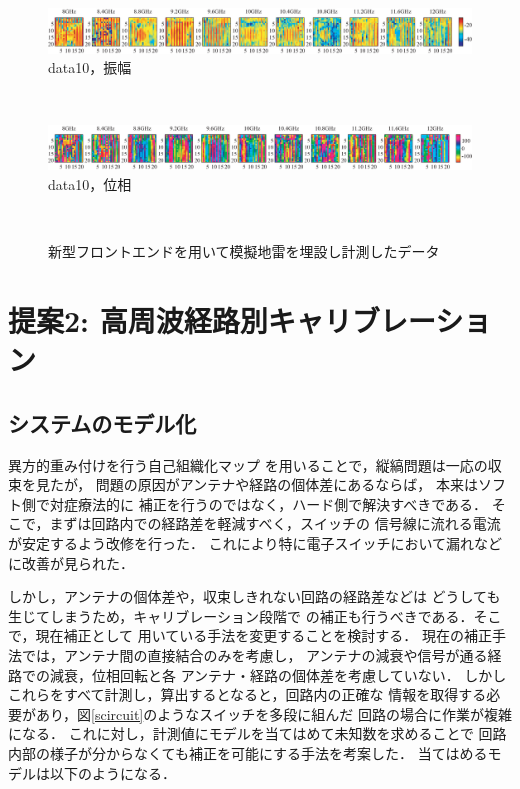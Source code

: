 ﻿\documentclass[12pt,oneside]{jsbook}
\begin{document}
\begin{figure}[hbtp]
 \begin{center}
     \begin{minipage}[c]{\hsize}
\includegraphics[width = \hsize ]{20170205_mine10_a.eps}
\centering\textmd{data10，振幅}
  \end{minipage}
\\
     \begin{minipage}[c]{\hsize}
\includegraphics[width = \hsize ]{20170205_mine10_p.eps}
\centering\textmd{data10，位相}
  \end{minipage}
\\
\caption{新型フロントエンドを用いて模擬地雷を埋設し計測したデータ}
\label{mine-ctwltsa}
 \end{center}
\end{figure}

\newpage
\chapter{提案2: 高周波経路別キャリブレーション}
\section{システムのモデル化}
異方的重み付けを行う自己組織化マップ
を用いることで，縦縞問題は一応の収束を見たが，
問題の原因がアンテナや経路の個体差にあるならば，
本来はソフト側で対症療法的に
補正を行うのではなく，ハード側で解決すべきである．
そこで，まずは回路内での経路差を軽減すべく，スイッチの
信号線に流れる電流が安定するよう改修を行った．
これにより特に電子スイッチにおいて漏れなどに改善が見られた．

しかし，アンテナの個体差や，収束しきれない回路の経路差などは
どうしても生じてしまうため，キャリブレーション段階で
の補正も行うべきである．そこで，現在補正として
用いている手法\cite{2008SMas}を変更することを検討する．
現在の補正手法では，アンテナ間の直接結合のみを考慮し，
アンテナの減衰や信号が通る経路での減衰，位相回転と各
アンテナ・経路の個体差を考慮していない．
しかしこれらをすべて計測し，算出するとなると，回路内の正確な
情報を取得する必要があり，図\ref{scircuit}のようなスイッチを多段に組んだ
回路の場合に作業が複雑になる．
これに対し，計測値にモデルを当てはめて未知数を求めることで
回路内部の様子が分からなくても補正を可能にする手法を考案した．
当てはめるモデルは以下のようになる．
\end{document}
